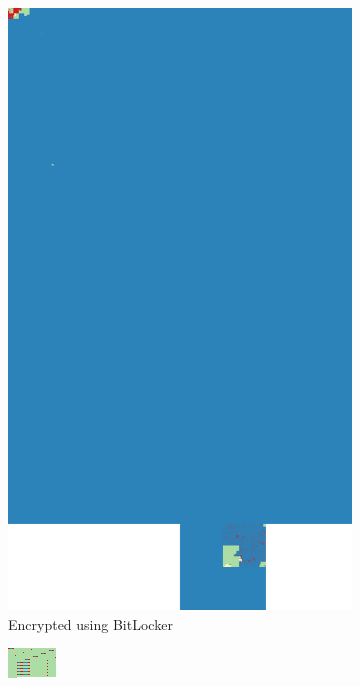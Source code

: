 \documentclass[
  digital, %
  color,   %
  oneside, %
  lof,     %
  nolot,     %
]{fithesis4}
\begin{document}
\begin{figure}
\begin{subfigure}[t]{.45\textwidth}
    \includegraphics[width=\textwidth,interpolate=false]{win-encrypted-chi2-4.png}
    \caption{Encrypted using BitLocker}
    \label{fig:bitlocker-enc}
  \end{subfigure}
  \begin{subfigure}[t]{0.45\textwidth}
    \centering
    \includegraphics[width=\textwidth,interpolate=false]{fve4.png}

\end{subfigure}
\end{figure}
\end{document}

